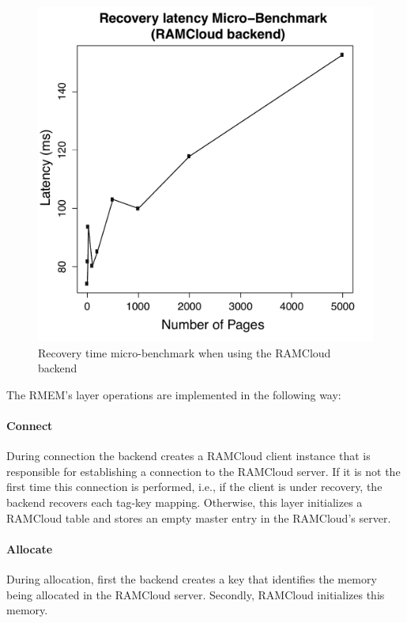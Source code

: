 \begin{figure}[t!]
\begin{center}
\includegraphics[scale=0.40]{graphs/recovery_time_rc_latencies.pdf}
\end{center}
\caption{Recovery time micro-benchmark when using the RAMCloud backend}
\label{fig:rc-recovery-ubm}
\end{figure}


The RMEM's layer operations are implemented in the following way:

\paragraph {\bf Connect} During connection the backend creates a RAMCloud
client instance that is responsible for establishing a connection to the
RAMCloud server.  If it is not the first time this connection is performed,
i.e., if the client is under recovery, the backend recovers each tag-key
mapping.  Otherwise, this layer initializes a RAMCloud table and stores an
empty master entry in the RAMCloud's server. 

\paragraph{\bf Allocate} During allocation, first the backend creates a key
that identifies the memory being allocated in the RAMCloud server. Secondly,
RAMCloud initializes this memory.

